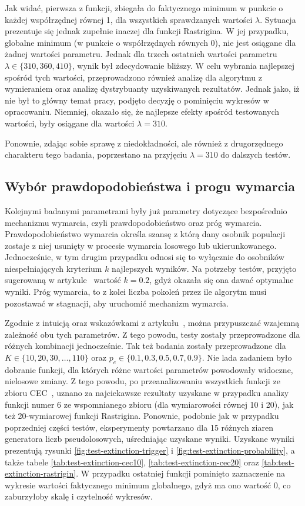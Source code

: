 \documentclass[10pt]{article}
\begin{document}
Jak widać, pierwsza z funkcji, zbiegała do faktycznego minimum w punkcie o każdej współrzędnej równej 1, dla wszystkich sprawdzanych wartości $\lambda$. Sytuacja prezentuje się jednak zupełnie inaczej dla funkcji Rastrigina. W jej przypadku, globalne minimum (w punkcie o współrzędnych równych 0), nie jest osiągane dla żadnej wartości parametru. Jednak dla trzech ostatnich wartości parametru $\lambda \in \{310, 360, 410\}$, wynik był zdecydowanie bliższy. W celu wybrania najlepszej spośród tych wartości, przeprowadzono również analizę dla algorytmu z wymieraniem oraz analizę dystrybuanty uzyskiwanych rezultatów. Jednak jako, iż nie był to główny temat pracy, podjęto decyzję o pominięciu wykresów w opracowaniu. Niemniej, okazało się, że najlepsze efekty spośród testowanych wartości, były osiągane dla wartości $\lambda = 310$.

Ponownie, zdając sobie sprawę z niedokładności, ale również z drugorzędnego charakteru tego badania, poprzestano na przyjęciu $\lambda = 310$ do dalszych testów.

\subsection{Wybór prawdopodobieństwa i progu wymarcia}
Kolejnymi badanymi parametrami były już parametry dotyczące bezpośrednio mechanizmu wymarcia, czyli prawdopodobieństwo oraz próg wymarcia. Prawdopodobieństwo wymarcia określa szansę z którą dany osobnik populacji zostaje z niej usunięty w procesie wymarcia losowego lub ukierunkowanego. Jednocześnie, w tym drugim przypadku odnosi się to wyłącznie do osobników niespełniających kryterium $k$ najlepszych wyników. Na potrzeby testów, przyjęto sugerowaną w artykule~\cite{ye2021} wartość $k=0.2$, gdyż okazała się ona dawać optymalne wyniki. Próg wymarcia, to z kolei liczba pokoleń przez ile algorytm musi pozostawać w stagnacji, aby uruchomić mechanizm wymarcia.

Zgodnie z intuicją oraz wskazówkami z artykułu~\cite{ye2021}, można przypuszczać wzajemną zależność obu tych parametrów. Z tego powodu, testy zostały przeprowadzone dla różnych kombinacji jednocześnie. Tak też badania zostały przeprowadzone dla $K \in \{10, 20, 30, \dots, 110\}$ oraz $p_{e} \in \{0.1, 0.3, 0.5, 0.7, 0.9\}$. Nie lada zadaniem było dobranie funkcji, dla których różne wartości parametrów powodowały widoczne, nielosowe zmiany. Z tego powodu, po przeanalizowaniu wszystkich funkcji ze zbioru CEC~\cite{CEC}, uznano za najciekawsze rezultaty uzyskane w przypadku analizy funkcji numer 6 ze wspomnianego zbioru (dla wymiarowości równej 10 i 20), jak też 20-wymiarowej funkcji Rastrigina. Ponownie, podobnie jak w przypadku poprzedniej części testów, eksperymenty powtarzano dla 15 różnych ziaren generatora liczb pseudolosowych, uśredniając uzyskane wyniki. Uzyskane wyniki prezentują rysunki \ref{fig:test-extinction-trigger} i \ref{fig:test-extinction-probability}, a także tabele \ref{tab:test-extinction-cec10}, \ref{tab:test-extinction-cec20} oraz \ref{tab:test-extinction-rastrigin}. W przypadku ostatniej funkcji pominięto zaznaczenie na wykresie wartości faktycznego minimum globalnego, gdyż ma ono wartość 0, co zaburzyłoby skalę i czytelność wykresów.
\end{document}
